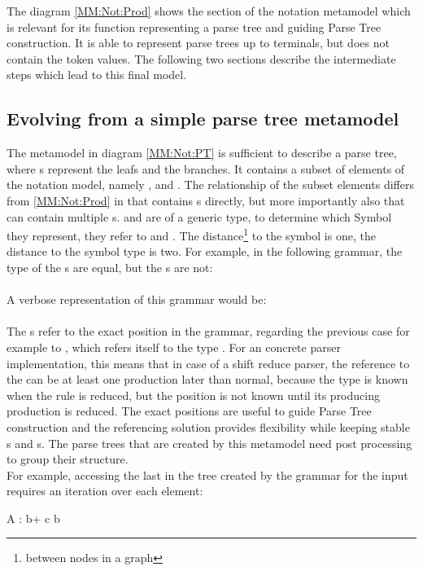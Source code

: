 The diagram \ref{MM:Not:Prod} shows the section of the notation metamodel which is relevant for its function representing a parse tree and guiding Parse Tree construction. It is able to represent parse trees up to terminals, but does not contain the token values. The following two sections describe the intermediate steps which lead to this final model.\\


\subsection{Evolving from a simple parse tree metamodel} The metamodel in diagram \ref{MM:Not:PT} is sufficient to describe a parse tree, where s represent the leafs and  the branches. It contains a subset of elements of the notation model, namely ,  and . The relationship of the subset elements differs from \ref{MM:Not:Prod} in that  contains s directly, but more importantly also that  can contain multiple s.  and  are of a generic type, to determine which Symbol they represent, they refer to  and . The distance\footnote{\raggedright between nodes in a graph} to the symbol is one, the distance to the symbol type is two. 
For example, in the following grammar, the type of the s are equal, but the s are not:\\
 \\
A verbose representation of this grammar would be: \\
 \\
The s refer to the exact position in the grammar, regarding the previous case for example to , which refers itself to the type . For an concrete parser implementation, this means that in case of a shift reduce parser, the reference to the  can be at least one production later than normal, because the type is known when the rule is reduced, but the position is not known until its producing production is reduced. The exact positions are useful to guide Parse Tree construction and the referencing solution provides flexibility while keeping stable s and s. The parse trees that are created by this metamodel need post processing to group their structure. \\
For example, accessing the last  in the tree created by the grammar for the input  requires an iteration over each element:\\
\begin{xtxt}
A : b+ c b 
\end{xtxt}


